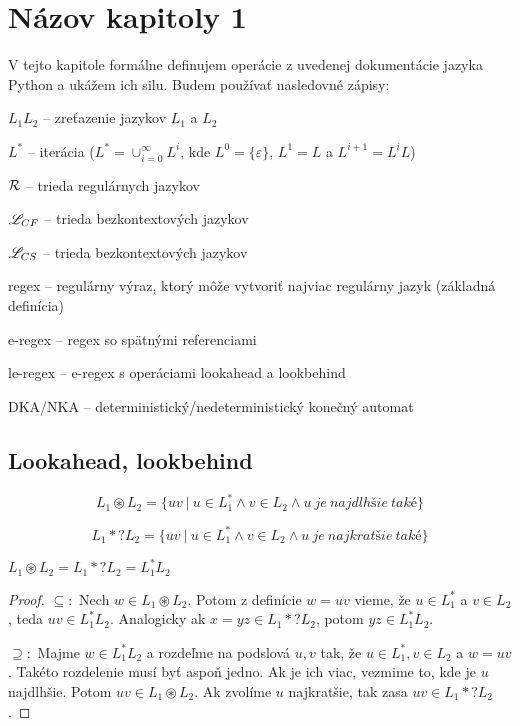 \chapter{Názov kapitoly 1}
\label{chap:kapitola1}

V tejto kapitole formálne definujem operácie z uvedenej dokumentácie jazyka Python \cite{Python3Documentation} a ukážem ich silu. Budem používať nasledovné zápisy:

$ L_{1}L_{2} $ -- zreťazenie jazykov $ L_{1} $ a $ L_{2} $

$ L^* $ -- iterácia ($L^*=\cup^{\infty}_{i=0}L^i$, kde $L^0=\lbrace \varepsilon \rbrace$, $L^1=L$ a $L^{i+1}=L^iL$)

$ {\cal R} $ -- trieda regulárnych jazykov

$ \mathscr{L}_{CF}$ -- trieda bezkontextových jazykov

$ \mathscr{L}_{CS}$ -- trieda bezkontextových jazykov

regex -- regulárny výraz, ktorý môže vytvoriť najviac regulárny jazyk (základná definícia)

e-regex -- regex so spätnými referenciami

le-regex -- e-regex s operáciami lookahead a lookbehind

DKA/NKA -- deterministický/nedeterministický konečný automat

\section{Lookahead, lookbehind}
\label{chap:lookahead}

\begin{df}
$$ L_{1} \circledast L_{2} = \lbrace uv ~|~ u \in L_1^* \land v \in L_2 \land u~je~najdlhšie~také \rbrace$$
\end{df}

\begin{df}
$$ L_{1} *? L_{2} = \lbrace uv ~|~ u \in L_1^* \land v \in L_2 \land u~je~najkratšie~také \rbrace $$
\end{df}

\begin{veta}
$L_1 \circledast L_2 = L_1 *? L_2 = L_1^*L_2$
\end{veta}
\begin{proof}
$\subseteq:$
Nech $w \in L_1 \circledast L_2$. Potom z definície $w=uv$ vieme, že $u \in L_1^*$ a $v \in L_2$, teda $uv \in L_1^*L_2$. Analogicky ak $x=yz \in L_1 *? L_2$, potom $yz \in L_1^*L_2$.

$\supseteq:$
Majme $w \in L_1^*L_2$ a rozdeľme na podslová $u,v$ tak, že $u \in L_1^*, v \in L_2$ a $w=uv$. Takéto rozdelenie musí byť aspoň jedno. Ak je ich viac, vezmime to, kde je $u$ najdlhšie. Potom $uv \in L_1 \circledast L_2$. Ak zvolíme $u$ najkratšie, tak zasa $uv \in L_1 *? L_2$.
\end{proof}

